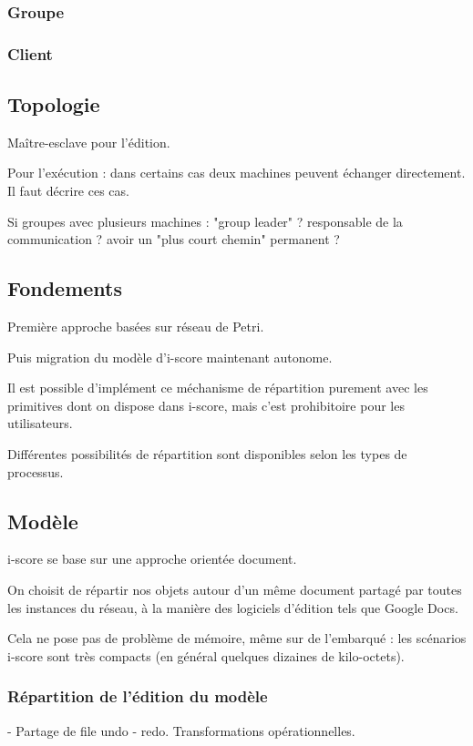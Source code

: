 \documentclass{article}
\begin{document}
\subsubsection{Groupe}
\subsubsection{Client}

\subsection{Topologie}
Maître-esclave pour l'édition.

Pour l'exécution : dans certains cas deux machines peuvent échanger directement.
Il faut décrire ces cas.

Si groupes avec plusieurs machines : "group leader" ? responsable de la communication ? avoir un "plus court chemin" permanent ?


\subsection{Fondements}
Première approche basées sur réseau de Petri.

Puis migration du modèle d'i-score maintenant autonome.

Il est possible d'implément ce méchanisme de répartition purement avec les primitives dont on dispose dans i-score, 
mais c'est prohibitoire pour les utilisateurs.

Différentes possibilités de répartition sont disponibles selon les types de processus.

\subsection{Modèle}
i-score se base sur une approche orientée document.

On choisit de répartir nos objets autour d'un même document partagé par toutes les instances du réseau, 
à la manière des logiciels d'édition tels que Google Docs. %

Cela ne pose pas de problème de mémoire, même sur de l'embarqué : 
les scénarios i-score sont très compacts (en général quelques dizaines de kilo-octets).

\subsubsection{Répartition de l'édition du modèle}
- Partage de file undo - redo. Transformations opérationnelles. %
\end{document}
